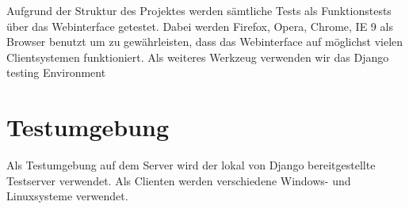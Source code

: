 


Aufgrund der Struktur des Projektes werden sämtliche Tests als Funktionstests
über das Webinterface getestet. Dabei werden Firefox, Opera, Chrome, IE 9 als
Browser benutzt um zu gewährleisten, dass das Webinterface auf möglichst vielen
Clientsystemen funktioniert. Als weiteres Werkzeug verwenden wir das Django
testing Environment

\section{Testumgebung}

Als Testumgebung auf dem Server wird der lokal von Django bereitgestellte Testserver
verwendet. Als Clienten werden verschiedene Windows- und Linuxsysteme
verwendet.
